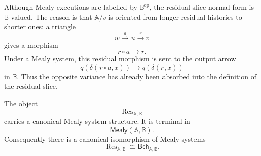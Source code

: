 \begin{remark}
\label{rem:residual-functor-variance}
Although Mealy executions are labelled by \(\mathbb B^{\mathrm{op}}\), the
residual-slice normal form is \(\mathbb B\)-valued. The reason is that
\(\mathbb A/v\) is oriented from longer residual histories to shorter ones:
a triangle
\[
w\xrightarrow{a}u\xrightarrow{r}v
\]
gives a morphism
\[
r\circ a\to r.
\]
Under a Mealy system, this residual morphism is sent to the output arrow
\[
q(\delta(r\circ a,x))\to q(\delta(r,x))
\]
in \(\mathbb B\). Thus the opposite variance has already been absorbed into
the definition of the residual slice.
\end{remark}

\begin{proposition}
\label{prop:residual-behaviours-terminal}
The object
\[
\operatorname{Res}_{\mathbb A,\mathbb B}
\]
carries a canonical Mealy-system structure. It is terminal in
\[
\mathsf{Mealy}(\mathbb A,\mathbb B).
\]
Consequently there is a canonical isomorphism of Mealy systems
\[
\operatorname{Res}_{\mathbb A,\mathbb B}
\cong
\mathsf{Beh}_{\mathbb A,\mathbb B}.
\]
\end{proposition}


